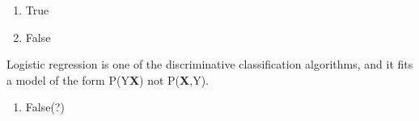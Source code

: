 \documentclass[
]{article}
\providecommand{\tightlist}{%
  \setlength{\itemsep}{0pt}\setlength{\parskip}{0pt}}
\begin{document}
\begin{enumerate}
\def\labelenumi{(\roman{enumi})}
\setcounter{enumi}{1}
\item
  True
\item
  False
\end{enumerate}

Logistic regression is one of the discriminative classification
algorithms, and it fits a model of the form P(Y\textbar{}\textbf{X}) not
P(\textbf{X},Y).

\begin{enumerate}
\def\labelenumi{(\roman{enumi})}
\setcounter{enumi}{3}
\tightlist
\item
  False(?)
\end{enumerate}
\end{document}
